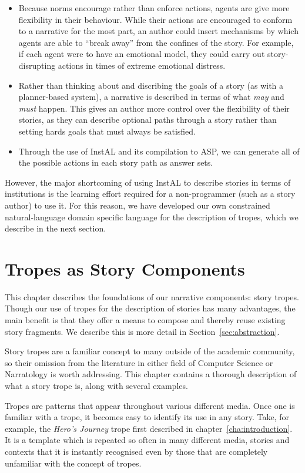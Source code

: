 \documentclass[11pt]{report}
\begin{document}
\begin{itemize}
  \item Because norms encourage rather than enforce actions, agents are give
    more flexibility in their behaviour. While their actions are encouraged to
    conform to a narrative for the most part, an author could insert mechanisms
    by which agents are able to ``break away'' from the confines of the story.
    For example, if each agent were to have an emotional model, they could carry
    out story-disrupting actions in times of extreme emotional distress.
  \item Rather than thinking about and discribing the goals of a story (as with
    a planner-based system), a narrative is described in terms of what
    \emph{may} and \emph{must} happen. This gives an author more control over
    the flexibility of their stories, as they can describe optional paths
    through a story rather than setting hards goals that must always be
    satisfied.
  \item Through the use of InstAL and its compilation to ASP, we can generate
    all of the possible actions in each story path as answer sets.
\end{itemize}

However, the major shortcoming of using InstAL to describe stories in terms of
institutions is the learning effort required for a non-programmer (such as a
story author) to use it. For this reason, we have developed our own constrained
natural-language domain specific language for the description of tropes, which
we describe in the next section.

\chapter{Tropes as Story Components}
\label{cha:tropes}
This chapter describes the foundations of our narrative components: story
tropes. Though our use of tropes for the description of stories has many
advantages, the main benefit is that they offer a means to compose and thereby
reuse existing story fragments. We describe this is more detail in Section~\ref{sec:abstraction}.

Story tropes are a familiar concept to many outside of the academic
community, so their omission from the literature in either field of Computer
Science or Narratology is worth addressing. This chapter contains a thorough
description of what a story trope is, along with several examples.

Tropes are patterns that appear throughout various different media. Once one is familiar
with a trope, it becomes easy to identify its use in any story. Take, for
example, the \emph{Hero's Journey} trope first described in
chapter~\ref{cha:introduction}. It is a template which is repeated so often in
many different media, stories and contexts that it is instantly recognised even
by those that are completely unfamiliar with the concept of tropes.
\end{document}
